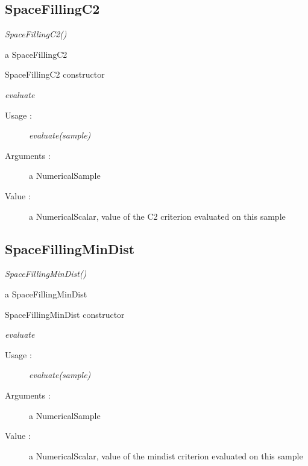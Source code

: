 \subsection{SpaceFillingC2}
\begin{description}

\item[Usage:] \rule{0pt}{1em}
  \begin{description}
  \item \textit{SpaceFillingC2()}
  \end{description}

\item[Value :] a SpaceFillingC2

\item[Details :]  \rule{0pt}{1em}
  \begin{description}
  \item SpaceFillingC2 constructor
  \end{description}

\item \textit{evaluate}
  \begin{description}
  \item[Usage :] \textit{evaluate(sample)}
  \item[Arguments :] a NumericalSample
  \item[Value :] a NumericalScalar, value of the C2 criterion evaluated on this sample
  \end{description}

\end{description}

\subsection{SpaceFillingMinDist}
\begin{description}

\item[Usage:] \rule{0pt}{1em}
  \begin{description}
  \item \textit{SpaceFillingMinDist()}
  \end{description}

\item[Value :] a SpaceFillingMinDist

\item[Details :]  \rule{0pt}{1em}
  \begin{description}
  \item SpaceFillingMinDist constructor
  \end{description}

\item \textit{evaluate}
  \begin{description}
  \item[Usage :] \textit{evaluate(sample)}
  \item[Arguments :] a NumericalSample
  \item[Value :] a NumericalScalar, value of the mindist criterion evaluated on this sample
  \end{description}

\end{description}

